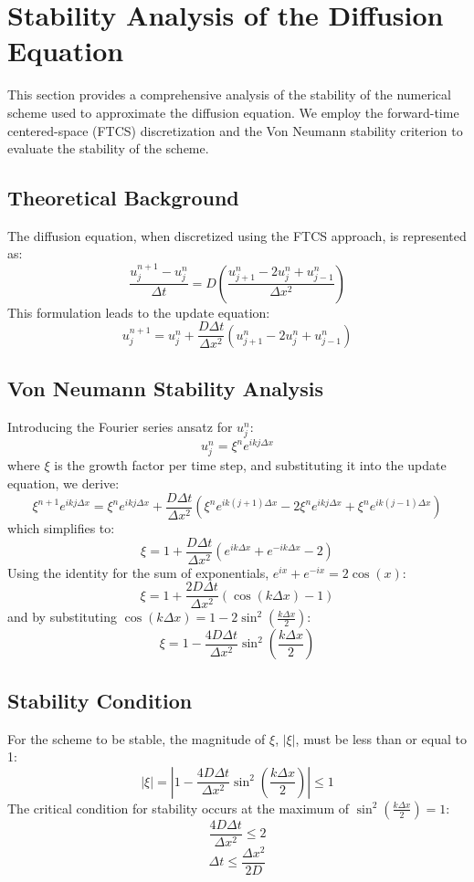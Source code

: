 \documentclass{article}
\begin{document}
\section{Stability Analysis of the Diffusion Equation}
This section provides a comprehensive analysis of the stability of the numerical scheme used to approximate the diffusion equation. We employ the forward-time centered-space (FTCS) discretization and the Von Neumann stability criterion to evaluate the stability of the scheme.

\subsection{Theoretical Background}
The diffusion equation, when discretized using the FTCS approach, is represented as:
\[
\frac{u_j^{n+1} - u_j^n}{\Delta t} = D \left(\frac{u_{j+1}^n - 2u_j^n + u_{j-1}^n}{\Delta x^2}\right)
\]
This formulation leads to the update equation:
\[
u_j^{n+1} = u_j^n + \frac{D\Delta t}{\Delta x^2} (u_{j+1}^n - 2u_j^n + u_{j-1}^n)
\]

\subsection{Von Neumann Stability Analysis}
Introducing the Fourier series ansatz for \( u_j^n \):
\[
u_j^n = \xi^n e^{ikj\Delta x}
\]
where \( \xi \) is the growth factor per time step, and substituting it into the update equation, we derive:
\[
\xi^{n+1} e^{ikj\Delta x} = \xi^n e^{ikj\Delta x} + \frac{D\Delta t}{\Delta x^2} \left(\xi^n e^{ik(j+1)\Delta x} - 2\xi^n e^{ikj\Delta x} + \xi^n e^{ik(j-1)\Delta x}\right)
\]
which simplifies to:
\[
\xi = 1 + \frac{D\Delta t}{\Delta x^2} \left(e^{ik\Delta x} + e^{-ik\Delta x} - 2\right)
\]
Using the identity for the sum of exponentials, \( e^{ix} + e^{-ix} = 2\cos(x) \):
\[
\xi = 1 + \frac{2D\Delta t}{\Delta x^2} (\cos(k\Delta x) - 1)
\]
and by substituting \( \cos(k\Delta x) = 1 - 2\sin^2\left(\frac{k\Delta x}{2}\right) \):
\[
\xi = 1 - \frac{4D\Delta t}{\Delta x^2} \sin^2\left(\frac{k\Delta x}{2}\right)
\]

\subsection{Stability Condition}
For the scheme to be stable, the magnitude of \( \xi \), \( |\xi| \), must be less than or equal to 1:
\[
|\xi| = \left| 1 - \frac{4D\Delta t}{\Delta x^2} \sin^2\left(\frac{k\Delta x}{2}\right) \right| \leq 1
\]
The critical condition for stability occurs at the maximum of \( \sin^2\left(\frac{k\Delta x}{2}\right) = 1 \):
\[
\frac{4D\Delta t}{\Delta x^2} \leq 2
\]
\[
\Delta t \leq \frac{\Delta x^2}{2D}
\]
\end{document}
